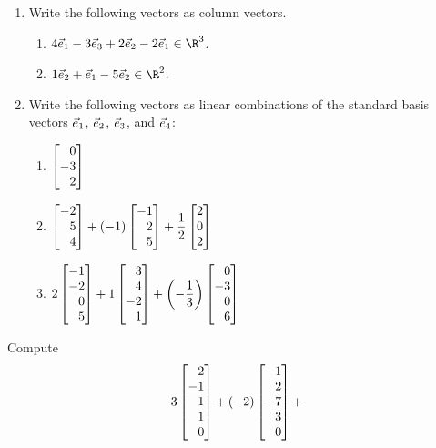 \begin{exercises}
	\begin{problist}
		\prob
		\begin{enumerate}
			\item
				Write the following vectors as column vectors.
				\begin{enumerate}
					\item $4\xhat -3\zhat +2\yhat -2\xhat\in\R^3$.
					\item $1\yhat +\xhat -5\yhat \in\R^2$.
				\end{enumerate}
			\item
				Write the following vectors as linear combinations of the standard
				basis vectors $\vec { e}_{1}$, $\vec { e}_{2}$, $\vec { e}_{3}$, and
				$\vec { e}_{4}$:
				\begin{enumerate}
					\item $\mat{0\\-3\\2}$
					\item $\displaystyle
						\mat{-2\\5\\4} + (-1)\mat{-1\\2\\ 5} + \frac12\mat{2\\0\\2}$
					\item $\displaystyle
						2\mat{-1\\-2\\0\\ 5}
						+1\mat{3\\4\\-2\\ 1}
						+\left(-\frac13\right)\mat{0\\-3\\0\\ 6}$
				\end{enumerate}
		\end{enumerate}
		\prob
		Compute
		\[
			3\mat{2\\-1\\1\\1\\0}+
			(-2)\mat{1\\2\\-7\\3\\0}+
\]
\end{problist}
\end{exercises}
